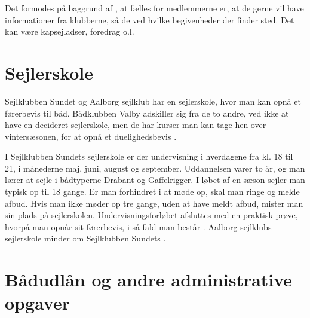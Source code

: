 Det formodes på baggrund af , at fælles for medlemmerne er, at de gerne vil have informationer fra klubberne, så de ved hvilke begivenheder der finder sted. 
Det kan være kapsejladser, foredrag o.l.


\section{Sejlerskole}\label{sec:sejlerskole}

Sejlklubben Sundet og Aalborg sejlklub har en sejlerskole, hvor man kan opnå et førerbevis til båd. 
Bådklubben Valby adskiller sig fra de to andre, ved ikke at have en decideret sejlerskole, men de har kurser man kan tage hen over vintersæsonen, for at opnå et duelighedsbevis \citep{baedklubben_valby_duelighedsbevis}.

I Sejlklubben Sundets sejlerskole er der undervisning i hverdagene fra kl. 18 til 21, i månederne maj, juni, august og september. 
Uddannelsen varer to år, og man lærer at sejle i bådtyperne Drabant og Gaffelrigger. 
I løbet af en sæson sejler man typisk op til 18 gange. 
Er man forhindret i at møde op, skal man ringe og melde afbud.
Hvis man ikke møder op tre gange, uden at have meldt afbud, mister man sin plads på sejlerskolen.
Undervisningsforløbet afsluttes med en praktisk prøve, hvorpå man opnår sit førerbevis, i så
fald man består \citep{Sundet}. 
Aalborg sejlklubs sejlerskole minder om Sejlklubben Sundets \citep{aalborg_sejlklub_sejlerskole}.


\section{Bådudlån og andre administrative opgaver}\label{subsec:bådudlån}

